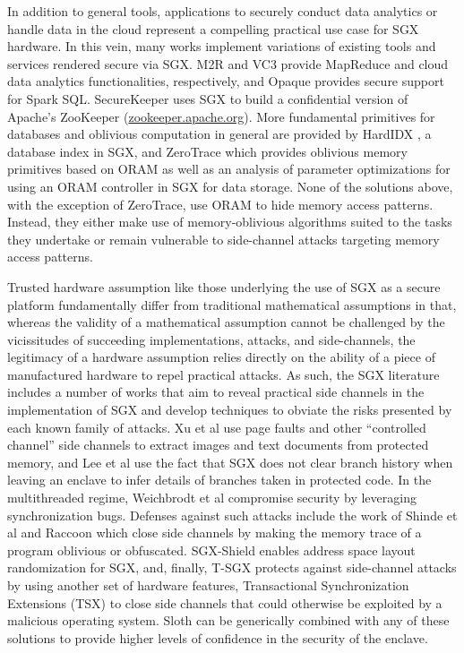 \documentclass[USenglish,oneside,twocolumn]{article}
\def\name/{Sloth}
\begin{document}
In addition to general tools, applications to securely conduct data analytics or handle data in the cloud represent a compelling practical use case for SGX hardware. In this vein, many works implement variations of existing tools and services rendered secure via SGX. M2R \cite{DSC+15} and VC3 \cite{SCF+15} provide MapReduce and cloud data analytics functionalities, respectively, and Opaque \cite{ZDB+17} provides secure support for Spark SQL. SecureKeeper \cite{BWG+16} uses SGX to build a confidential version of Apache's ZooKeeper (\url{zookeeper.apache.org}). More fundamental primitives for databases and oblivious computation in general are provided by HardIDX \cite{FBB+17}, a database index in SGX, and ZeroTrace \cite{SGF17} which provides oblivious memory primitives based on ORAM as well as an analysis of parameter optimizations for using an ORAM controller in SGX for data storage. None of the solutions above, with the exception of ZeroTrace, use ORAM to hide memory access patterns. Instead, they either make use of memory-oblivious algorithms suited to the tasks they undertake or remain vulnerable to side-channel attacks targeting memory access patterns. 

Trusted hardware assumption like those underlying the use of SGX as a secure platform fundamentally differ from traditional mathematical assumptions in that, whereas the validity of a mathematical assumption cannot be challenged by the vicissitudes of succeeding implementations, attacks, and side-channels, the legitimacy of a hardware assumption relies directly on the ability of a piece of manufactured hardware to repel practical attacks. As such, the SGX literature includes a number of works that aim to reveal practical side channels in the implementation of SGX and develop techniques to obviate the risks presented by each known family of attacks. Xu et al \cite{XCP15} use page faults and other ``controlled channel'' side channels to extract images and text documents from protected memory, and Lee et al \cite{LSG+16} use the fact that SGX does not clear branch history when leaving an enclave to infer details of branches taken in protected code. In the multithreaded regime, Weichbrodt et al \cite{WKPK16} compromise security by leveraging synchronization bugs. Defenses against such attacks include the work of Shinde et al \cite{SCNS16} and Raccoon \cite{RLT15} which close side channels by making the memory trace of a program oblivious or obfuscated. SGX-Shield \cite{SLK+17} enables address space layout randomization for SGX, and, finally, T-SGX \cite{SLKP17} protects against side-channel attacks by using another set of hardware features, Transactional Synchronization Extensions (TSX) to close side channels that could otherwise be exploited by a malicious operating system. \name/ can be generically combined with any of these solutions to provide higher levels of confidence in the security of the enclave. 
\end{document}
